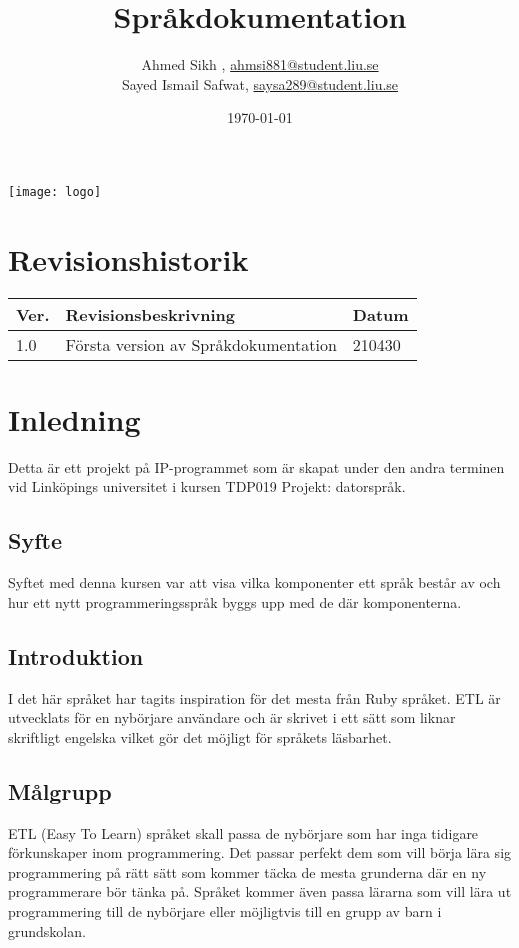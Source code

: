 \documentclass{TDP019mall}
\author{Ahmed Sikh , \url{ahmsi881@student.liu.se}\\
Sayed Ismail Safwat, \url{saysa289@student.liu.se}}
\title{Språkdokumentation}
\date{\today}
\begin{document}
\begin{center}
\texttt{[image: logo]}
\end{center}

\projectpage
\tableofcontents
\newpage
\section{Revisionshistorik}
\begin{table}[!h]
\begin{tabularx}{\linewidth}{|l|X|l|}
\hline
Ver. & Revisionsbeskrivning & Datum \\\hline
1.0 & Första version av Språkdokumentation & 210430 \\\hline
\end{tabularx}
\end{table}



\section{Inledning}
Detta är ett projekt på IP-programmet som är skapat under den andra terminen vid Linköpings universitet i kursen TDP019 Projekt: datorspråk.

\subsection{Syfte}
Syftet med denna kursen var att visa vilka komponenter ett språk består av och hur ett nytt programmeringsspråk byggs upp med de där komponenterna. 

\subsection{Introduktion}
I det här språket har tagits inspiration för det mesta från Ruby språket. ETL är utvecklats för en nybörjare användare och är skrivet i ett sätt som 
liknar skriftligt engelska vilket gör det möjligt för språkets läsbarhet.

\subsection{Målgrupp}
ETL (Easy To Learn) språket skall passa de nybörjare som har inga tidigare förkunskaper inom programmering. Det passar perfekt dem som vill börja lära 
sig programmering på rätt sätt som kommer täcka de mesta grunderna där en ny programmerare bör tänka på. Språket kommer även passa lärarna som vill lära
ut programmering till de nybörjare eller möjligtvis till en grupp av barn i grundskolan.
\end{document}

